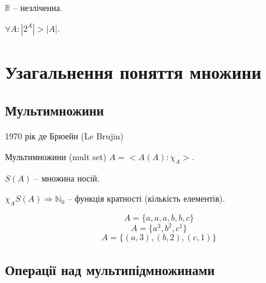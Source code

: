 \begin{theorem}[Теорема К1.75]
    $\mathbb{R}$ -- незліченна.
\end{theorem}

\begin{theorem}[Теорема К2]
    $\forall A: |2^A| > |A|$.
\end{theorem}

\section{Узагальнення поняття множини}

\subsection{Мультимножини}

1970 рік де Брюейн (Le Brujin)

\begin{definition}[Мультимножини]
    Мультимножини (mult set) $A = <A(A): \chi_A>$.
\end{definition}

\begin{definition}
    $S(A)$ -- множина носій.
\end{definition}

\begin{definition}
    $\chi_A S(A) \Rightarrow \mathbb{N}_0$ -- функція кратності (кількість елементів).
\end{definition}

\begin{definition}
    $$A = \{ a, a, a, b, b, c \}$$
    $$A = \{ a^3, b^2, c^1 \}$$
    $$A = \{ (a, 3), (b, 2), (c, 1) \}$$
\end{definition}

\subsection{Операції над мультипідмножинами}

